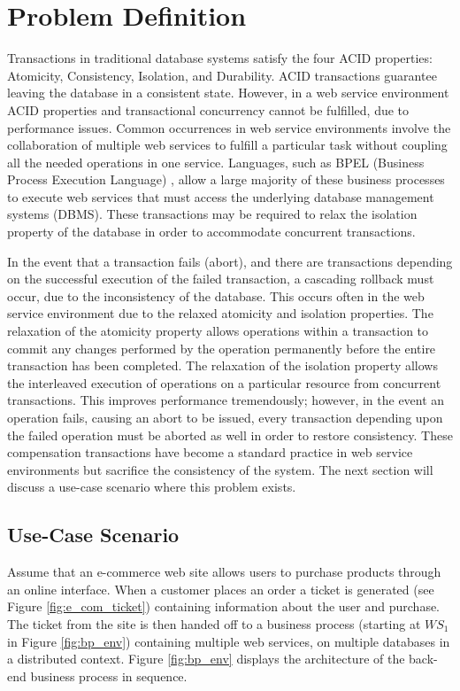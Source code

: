 \section{Problem Definition}
\label{pbs:problem_def}
Transactions in traditional database systems satisfy the four ACID  properties: Atomicity, Consistency, Isolation, and Durability. ACID transactions guarantee leaving the database in a consistent state. However, in a web service environment ACID properties and transactional concurrency cannot be fulfilled, due to performance issues. Common occurrences in web service environments involve the collaboration of multiple web services to fulfill a particular task without coupling all the needed operations in one service. Languages, such as BPEL (Business Process Execution Language) \cite{BPEL}, allow a large majority of these business processes to execute web services that must access the underlying database management systems (DBMS). These transactions may be required to relax the isolation property of the database in order to accommodate concurrent transactions.

In the event that a transaction fails (abort), and there are transactions depending on the successful execution of the failed transaction, a cascading rollback must occur, due to the inconsistency of the database. This occurs often in the web service environment due to the relaxed atomicity and isolation properties. The relaxation of the atomicity property allows operations within a transaction to commit any changes performed by the operation permanently before the entire transaction has been completed. The relaxation of the isolation property allows the interleaved execution of operations on a particular resource from concurrent transactions. This improves performance tremendously; however, in the event an operation fails, causing an abort to be issued, every transaction depending upon the failed operation must be aborted as well in order to restore consistency. These compensation transactions have become a standard practice in web service environments but sacrifice the consistency of the system. The next section will discuss a use-case scenario where this problem exists.

\subsection{Use-Case Scenario}
\label{subsec:use_case}
Assume that an e-commerce web site allows users to purchase products through an online interface. When a customer places an order a ticket is generated (see Figure \ref{fig:e_com_ticket}) containing information about the user and purchase. The ticket from the site is then handed off to a business process (starting at $WS_{1}$ in Figure \ref{fig:bp_env}) containing multiple web services, on multiple databases in a distributed context. Figure \ref{fig:bp_env} displays the architecture of the back-end business process in sequence.

